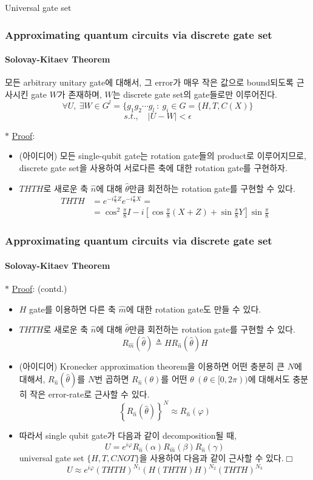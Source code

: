 \documentclass[9pt]{beamer}
\begin{document}
\begin{section}{Universal gate set}
        \begin{frame}
            \frametitle{Approximating quantum circuits via discrete gate set}
            \framesubtitle{Solovay-Kitaev Theorem}
            \begin{theorem}
                모든 arbitrary unitary gate에 대해서, 그 error가 매우 작은 값으로 bound되도록 근사시킨 gate $W$가 존재하며, $W$는 discrete gate set의 gate들로만 이루어진다.
                $$\forall U,\ \exists W \in G^l = \{g_1g_2 \cdots g_l\ : \ g_i \in G = \{H, T, C(X)\} $$
                $$s.t., \quad |U-W| < \epsilon $$
            \end{theorem}
            \vspace{0.2cm}
            $\ast$ \underline{Proof}:
            \begin{itemize}
                \item (아이디어) 모든 single-qubit gate는 rotation gate들의 product로 이루어지므로, discrete gate set을 사용하여 서로다른 축에 대한 rotation gate를 구현하자.
                \item $THTH$로 새로운 축 $\hat n$에 대해 $\hat \theta$만큼 회전하는 rotation gate를 구현할 수 있다.
                $$\begin{aligned} THTH &=  e^{-i\frac{\pi}{8}Z}e^{-i\frac{\pi}{8}X} = \\ &= \boxed{\cos ^2 \frac{\pi}{8} I-i\left[\cos \frac{\pi}{8}(X+Z)+\sin \frac{\pi}{8} Y\right] \sin \frac{\pi}{8}} \end{aligned}$$
            \end{itemize}
        \end{frame}

        \begin{frame}
            \frametitle{Approximating quantum circuits via discrete gate set}
            \framesubtitle{Solovay-Kitaev Theorem}
            $\ast$ \underline{Proof}: (contd.)
            \begin{itemize}
                \item $H$ gate를 이용하면 다른 축 $\hat m$에 대한 rotation gate도 만들 수 있다.
                \item $THTH$로 새로운 축 $\hat n$에 대해 $\hat \theta$만큼 회전하는 rotation gate를 구현할 수 있다.
                $$R_{\hat m} (\hat \theta) \triangleq H R_{\hat n} (\hat \theta) H $$
                \item (아이디어) Kronecker approximation theorem을 이용하면 어떤 충분히 큰 $N$에 대해서, $R_{\hat n}(\hat \theta)$를 $N$번 곱하면 $R_{\hat n} (\theta)$를 어떤 $\theta\ (\theta \in [0, 2\pi))$에 대해서도 충분히 작은 error-rate로 근사할 수 있다.
                $$\left \{R_{\hat n} \left( \hat \theta \right) \right\}^N \approx R_{\hat n} (\varphi)$$
                \item 따라서 single qubit gate가 다음과 같이 decomposition될 때,
                $$U = e^{i\varphi} R_{\hat n}(\alpha) R_{\hat m}(\beta) R_{\hat n}(\gamma)$$
                universal gate set $\{H, T, CNOT\}$을 사용하여 다음과 같이 근사할 수 있다.$\Box$
                $$U \approx e^{i\varphi}(THTH)^{N_1}(H(THTH)H)^{N_2}(THTH)^{N_3}$$
                

\end{itemize}
\end{frame}
\end{section}
\end{document}
